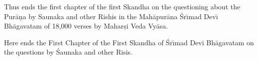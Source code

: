 Thus ends the first chapter of the first Skandha on the questioning about the Pur\=a\d{n}a by Saunaka and other Rishis in the Mah\=apur\=ana \'Sr\={\i}mad Dev\={\i} Bh\=agavatam of 18,000 verses by Mahar\d{s}i Veda Vy\=asa.

Here ends the First Chapter of the First Skandha of \'Sr\={\i}mad Devi Bh\=agavatam on the questions by \'Saunaka and other Risis.



